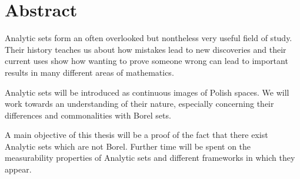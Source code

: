 \section*{Abstract}

Analytic sets form an often overlooked but nontheless very useful field of study. 
Their history teaches us about how mistakes lead to new discoveries and their current uses show how wanting to prove someone wrong can lead to important results in many different areas of mathematics. 

Analytic sets will be introduced as continuous images of Polish spaces. 
We will work towards an understanding of their nature, especially concerning their differences and commonalities with Borel sets.

A main objective of this thesis will be a  proof of the fact that there exist Analytic sets which are not Borel. 
Further time will be spent on the measurability properties of Analytic sets and different frameworks in which they appear.

